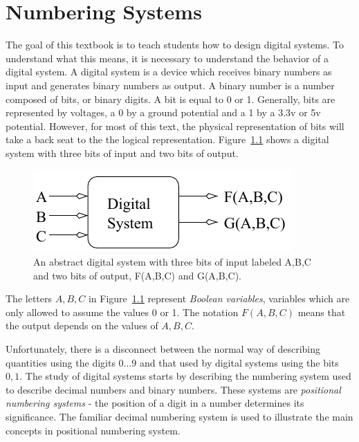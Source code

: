 \chapter{Numbering Systems}
\label{chapter:NumberingSystems}
\graphicspath{ {./chapter01/Fig} }

The goal of this textbook is to teach students how to design digital systems.
To understand what this means, it is necessary to understand the behavior of
a digital system.  A digital system is a device which receives binary
numbers as input and generates binary numbers as output.  A binary number
is a number composed of bits, or binary digits.  A bit is equal to 
0 or 1.  Generally, bits are represented by voltages, a 0 by a ground 
potential and a 1 by a 3.3v or 5v potential.  However, for most of this 
text, the physical representation of bits will take a back seat to the
the logical representation.  Figure~\ref{fig:numberingSys} shows 
a digital system with three bits of input and two bits of output.

\begin{figure}[ht]
\includegraphics{sys}
\caption{An abstract digital system with three bits of input
labeled A,B,C and two bits of output, F(A,B,C) and G(A,B,C).}
\label{fig:numberingSys}
\end{figure}

The letters $A,B,C$ in Figure~\ref{fig:numberingSys} represent \textit{ Boolean variables}, 
 variables which are only allowed to assume the values 
0 or 1.  The notation $F(A,B,C)$ means that the output depends on the values 
of $A,B,C$. 

Unfortunately, there is a disconnect between the normal way of describing
quantities using the digits $0 \ldots 9$ and that used by digital systems
using the bits $0,1$.  The study of digital systems starts by describing
the numbering system used to describe decimal numbers and binary numbers.  
These systems are
\textit{ positional numbering systems}  
- the position of a digit in a number determines its significance.  The
familiar decimal numbering system is used to illustrate the main concepts
in positional numbering system.

